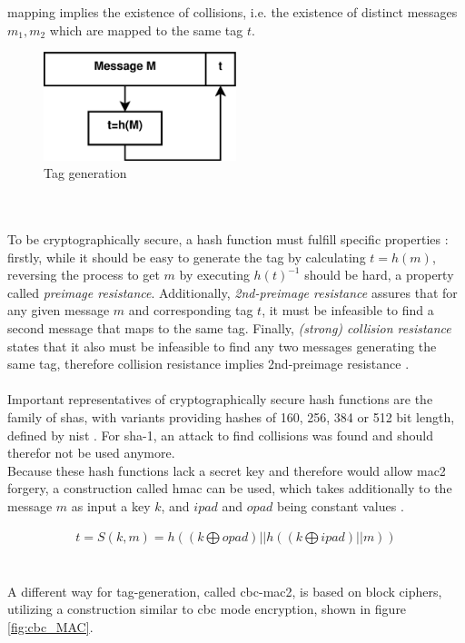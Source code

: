 mapping implies the existence of collisions, i.e. the existence of distinct messages $m_1, m_2$ which are mapped to the same tag $t$.
\begin{figure}
    \centering
    \includegraphics[width=0.5\textwidth]{figures/tag.eps}
    \caption{Tag generation}
    \label{fig:tag}
\end{figure}
\\
\\
To be cryptographically secure, a hash function must fulfill specific properties \cite{6732428}: firstly, while it should be easy to generate the tag
by calculating $t = h(m)$, reversing the process to get $m$ by executing $h(t)^{-1}$ should be hard, a property called \textit{preimage resistance}. 
Additionally, \textit{2nd-preimage resistance} assures that for any given message $m$ and corresponding tag $t$, it must be infeasible to find a second message
that maps to the same tag. Finally, \textit{(strong) collision resistance} states that it also must be infeasible to find any two messages generating
the same tag, therefore collision resistance implies 2nd-preimage resistance \cite{handbookCR}.
\\
\\
Important representatives of cryptographically secure hash functions are the family of \glspl{sha}, with variants providing hashes of 160, 256, 384 or 512 bit 
length, defined by \gls{nist} \cite{nistSHA}. For \gls{sha}-1, an attack to find collisions was found \cite{Wang05findingcollisions} and should therefor not
be used anymore.
\\
Because these hash functions lack a secret key and therefore would allow \gls{mac2} forgery, a construction called \gls{hmac} can be used, which takes 
additionally to the message $m$ as input a key $k$, and $ipad$ and $opad$ being constant values \cite{hmac}.

\begin{align}
 t = S(k, m) = h((k \bigoplus opad) || h((k \bigoplus ipad) || m)) 
\end{align}
\\
\\
A different way for tag-generation, called \gls{cbc}-\gls{mac2}, is based on block ciphers, utilizing a construction similar to \gls{cbc} mode encryption,
shown in figure \ref{fig:cbc_MAC}. 

